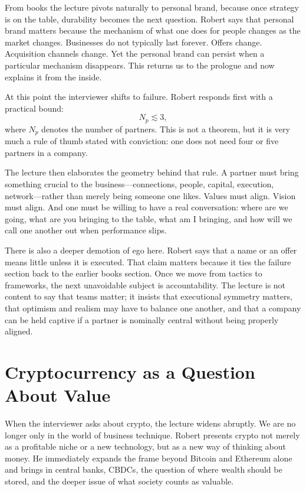 From books the lecture pivots naturally to personal brand, because once strategy is on the table, durability becomes the next question. Robert says that personal brand matters because the mechanism of what one does for people changes as the market changes. Businesses do not typically last forever. Offers change. Acquisition channels change. Yet the personal brand can persist when a particular mechanism disappears. This returns us to the prologue and now explains it from the inside.

At this point the interviewer shifts to failure. Robert responds first with a practical bound:
\begin{equation}
N_p \lesssim 3,
\end{equation}
where \(N_p\) denotes the number of partners. This is not a theorem, but it is very much a rule of thumb stated with conviction: one does not need four or five partners in a company.

The lecture then elaborates the geometry behind that rule. A partner must bring something crucial to the business---connections, people, capital, execution, network---rather than merely being someone one likes. Values must align. Vision must align. And one must be willing to have a real conversation: where are we going, what are you bringing to the table, what am I bringing, and how will we call one another out when performance slips.

There is also a deeper demotion of ego here. Robert says that a name or an offer means little unless it is executed. That claim matters because it ties the failure section back to the earlier books section. Once we move from tactics to frameworks, the next unavoidable subject is accountability. The lecture is not content to say that teams matter; it insists that executional symmetry matters, that optimism and realism may have to balance one another, and that a company can be held captive if a partner is nominally central without being properly aligned.

\section{Cryptocurrency as a Question About Value}

When the interviewer asks about crypto, the lecture widens abruptly. We are no longer only in the world of business technique. Robert presents crypto not merely as a profitable niche or a new technology, but as a new way of thinking about money. He immediately expands the frame beyond Bitcoin and Ethereum alone and brings in central banks, CBDCs, the question of where wealth should be stored, and the deeper issue of what society counts as valuable.

